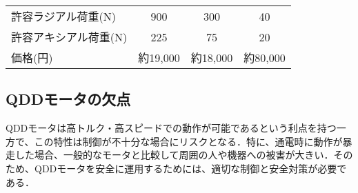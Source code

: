\begin{table}[]
\begin{tabular}{lccc}
  許容ラジアル荷重(N)  & 900                                                           & 300                                                           & 40                                                          \\
  許容アキシアル荷重(N) & 225                                                           & 75                                                            & 20                                                          \\
  価格(円)        & 約19,000                                                       & 約18,000                                                       & 約80,000                                                     \\ \hline
  \end{tabular}
\end{table}

\subsection{QDDモータの欠点}
QDDモータは高トルク・高スピードでの動作が可能であるという利点を持つ一方で、この特性は制御が不十分な場合にリスクとなる．特に、通電時に動作が暴走した場合、一般的なモータと比較して周囲の人や機器への被害が大きい．そのため、QDDモータを安全に運用するためには、適切な制御と安全対策が必要である．
\newpage